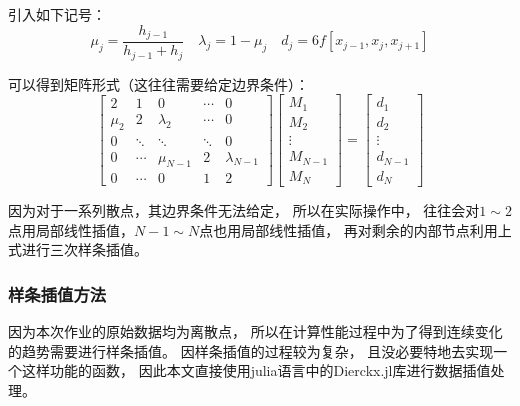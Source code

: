 引入如下记号：
\begin{equation}
    \mu_j = \frac{h_{j-1}}{h_{j-1}+h_j}\quad \lambda_j = 1 - \mu_j
    \quad
    d_j = 6f[x_{j-1}, x_{j}, x_{j+1}]
\end{equation}

可以得到矩阵形式（这往往需要给定边界条件）：
\begin{equation}
    \begin{bmatrix}
        2 & 1 & 0 & \cdots & 0\\
        \mu_2 & 2 & \lambda_2 & \cdots & 0\\
        0 & \ddots & \ddots & \ddots &0\\
        0 & \cdots & \mu_{N-1} & 2 & \lambda_{N-1}\\
        0 & \cdots & 0 & 1 & 2
    \end{bmatrix}
    \begin{bmatrix}
        M_1 \\ M_2 \\ \vdots \\ M_{N-1} \\ M_N
    \end{bmatrix}
    =
    \begin{bmatrix}
        d_1 \\ d_2 \\ \vdots \\ d_{N-1} \\ d_{N}
    \end{bmatrix}
\end{equation}

因为对于一系列散点，其边界条件无法给定，
所以在实际操作中，
往往会对$1\sim 2$点用局部线性插值，$N-1\sim N$点也用局部线性插值，
再对剩余的内部节点利用上式进行三次样条插值。

\subsubsection{样条插值方法}

因为本次作业的原始数据均为离散点，
所以在计算性能过程中为了得到连续变化的趋势需要进行样条插值。
因样条插值的过程较为复杂，
且没必要特地去实现一个这样功能的函数，
因此本文直接使用julia语言中的Dierckx.jl库进行数据插值处理。